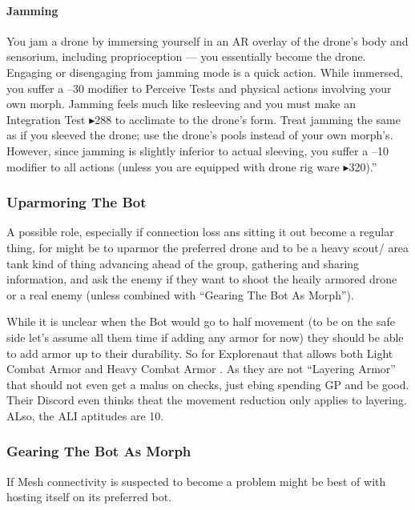 \paragraph{Jamming} You jam a drone by immersing yourself in an AR overlay of the drone’s body and sensorium, including proprioception — you essentially become the drone. Engaging or disengaging from jamming mode is a quick action. While immersed, you suffer a –30 modifier to Perceive Tests and physical actions involving your own morph. Jamming feels much like resleeving and you must make an Integration Test $\blacktriangleright$288 to acclimate to the drone’s form. Treat jamming the same as if you sleeved the drone; use the drone's pools instead of your own morph's. However, since jamming is slightly inferior to actual sleeving, you suffer a –10 modifier to all actions (unless you are equipped with drone rig ware $\blacktriangleright$320).” \citep[pg. 346]{ep2e_1.1_2019}

\subsubsection{Uparmoring The Bot}

A possible role, especially if connection loss ans sitting it out become a regular thing, for \texttt{\egr{}}\index{\egr{}} might be to uparmor the preferred drone and to be a heavy scout/ area tank kind of thing advancing ahead of the group, gathering and sharing information, and ask the enemy if they want to shoot the heaily armored drone or a real enemy (unless combined with “Gearing The Bot As Morph”).

While it is unclear when the Bot would go to half movement (to be on the safe side let's assume all them time if adding any armor for now) they should be able to add armor up to their durability. So for Explorenaut that allows both Light Combat Armor and Heavy Combat Armor \citep[p. 215]{ep2e_1.1_2019}. As they are not “Layering Armor” that should not even get a malus on checks, just ebing spending GP and be good. Their Discord even thinks theat the movement reduction only applies to layering. ALso, the ALI aptitudes are 10. 

\subsubsection{Gearing The Bot As Morph}

If \gls{Mesh} connectivity is suspected to become a problem \texttt{\egr{}}\index{\egr{}} might be best of with hosting itself on its preferred bot.


